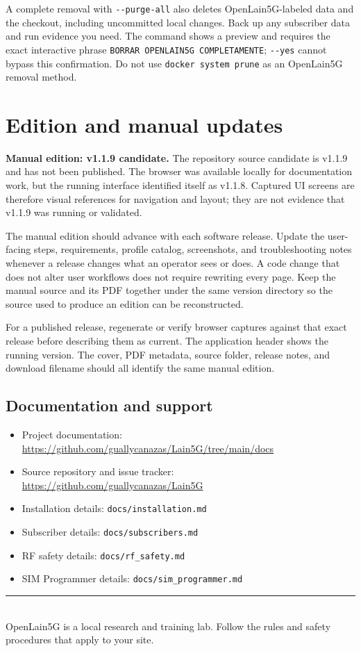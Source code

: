 \documentclass[11pt,a4paper,oneside]{article}
\newcommand{\cmd}[1]{\texttt{\small #1}}
\newcommand{\manualsection}[2]{\clearpage\section{#1}\label{#2}}
\begin{document}
A complete removal with \cmd{\mbox{-}\mbox{-}purge-all} also deletes OpenLain5G-labeled data and the checkout, including uncommitted local changes. Back up any subscriber data and run evidence you need. The command shows a preview and requires the exact interactive phrase \cmd{BORRAR OPENLAIN5G COMPLETAMENTE}; \cmd{\mbox{-}\mbox{-}yes} cannot bypass this confirmation. Do not use \cmd{docker system prune} as an OpenLain5G removal method.

\manualsection{Edition and manual updates}{edition}
\begin{infobox}
\textbf{Manual edition: v1.1.9 candidate.} The repository source candidate is v1.1.9 and has not been published. The browser was available locally for documentation work, but the running interface identified itself as v1.1.8. Captured UI screens are therefore visual references for navigation and layout; they are not evidence that v1.1.9 was running or validated.
\end{infobox}

The manual edition should advance with each software release. Update the user-facing steps, requirements, profile catalog, screenshots, and troubleshooting notes whenever a release changes what an operator sees or does. A code change that does not alter user workflows does not require rewriting every page. Keep the manual source and its PDF together under the same version directory so the source used to produce an edition can be reconstructed.

For a published release, regenerate or verify browser captures against that exact release before describing them as current. The application header shows the running version. The cover, PDF metadata, source folder, release notes, and download filename should all identify the same manual edition.

\subsection*{Documentation and support}
\begin{itemize}
  \item Project documentation: \url{https://github.com/guallycanazas/Lain5G/tree/main/docs}
  \item Source repository and issue tracker: \url{https://github.com/guallycanazas/Lain5G}
  \item Installation details: \cmd{docs/installation.md}
  \item Subscriber details: \cmd{docs/subscribers.md}
  \item RF safety details: \cmd{docs/rf\_safety.md}
  \item SIM Programmer details: \cmd{docs/sim\_programmer.md}
\end{itemize}

\vfill
\begin{center}
{\color{Rule}\rule{0.8\linewidth}{0.5pt}}\\[2mm]
{\small\color{Muted}OpenLain5G is a local research and training lab. Follow the rules and safety procedures that apply to your site.}
\end{center}
\end{document}
